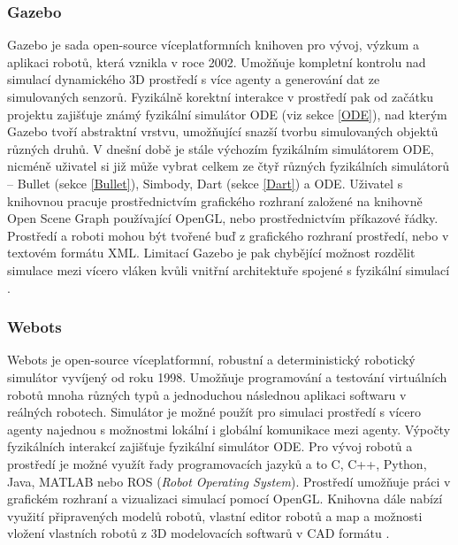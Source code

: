 \subsubsection{Gazebo} \label{Gazebo}
Gazebo \citep{gazeborobotics} je sada open-source víceplatformních knihoven pro
vývoj, výzkum a aplikaci robotů, která vznikla v roce 2002. Umožňuje kompletní
kontrolu nad simulací dynamického 3D prostředí s více agenty a generování dat
ze simulovaných senzorů. Fyzikálně korektní interakce v prostředí pak od
začátku projektu zajišťuje známý fyzikální simulátor ODE (viz sekce \ref{ODE}),
nad kterým Gazebo tvoří abstraktní vrstvu, umožňující snazší tvorbu
simulovaných objektů různých druhů. V dnešní době je stále výchozím fyzikálním
simulátorem ODE, nicméně uživatel si již může vybrat celkem ze čtyř různých
fyzikálních simulátorů -- Bullet (sekce \ref{Bullet}), Simbody, Dart (sekce
\ref{Dart}) a ODE. Uživatel s knihovnou pracuje prostřednictvím grafického
rozhraní založené na knihovně Open Scene Graph používající OpenGL, nebo
prostřednictvím příkazové řádky. Prostředí a roboti mohou být tvořené buď z
grafického rozhraní prostředí, nebo v textovém formátu XML. Limitací Gazebo je
pak chybějící možnost rozdělit simulace mezi vícero vláken kvůli vnitřní
architektuře spojené s fyzikální simulací \citep{koenig2004design}. 

\subsubsection{Webots} \label{Webots}
Webots \citep{Webots} je open-source víceplatformní, robustní a deterministický
robotický simulátor vyvíjený od roku 1998. Umožňuje programování a testování
virtuálních robotů mnoha různých typů a jednoduchou následnou aplikaci softwaru
v reálných robotech. Simulátor je možné použít pro simulaci prostředí s vícero
agenty najednou s možnostmi lokální i globální komunikace mezi agenty. Výpočty
fyzikálních interakcí zajišťuje fyzikální simulátor ODE. Pro vývoj robotů a
prostředí je možné využít řady programovacích jazyků a to C, C++, Python, Java,
MATLAB nebo ROS (\emph{Robot Operating System}). Prostředí umožňuje práci v
grafickém rozhraní a vizualizaci simulací pomocí OpenGL. Knihovna dále nabízí
využití připravených modelů robotů, vlastní editor robotů a map a možnosti
vložení vlastních robotů z 3D modelovacích softwarů v CAD formátu
\citep{michel2004cyberbotics}.

